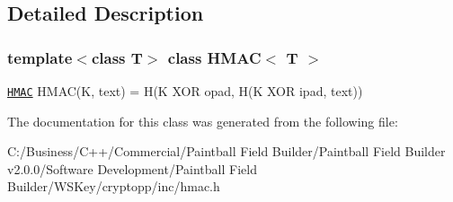 \subsection{Detailed Description}
\subsubsection*{template$<$class T$>$ class HMAC$<$ T $>$}

\href{http://www.weidai.com/scan-mirror/mac.html#HMAC}{\tt HMAC} HMAC(K, text) = H(K XOR opad, H(K XOR ipad, text)) 

The documentation for this class was generated from the following file:\begin{DoxyCompactItemize}
\item 
C:/Business/C++/Commercial/Paintball Field Builder/Paintball Field Builder v2.0.0/Software Development/Paintball Field Builder/WSKey/cryptopp/inc/hmac.h\end{DoxyCompactItemize}

